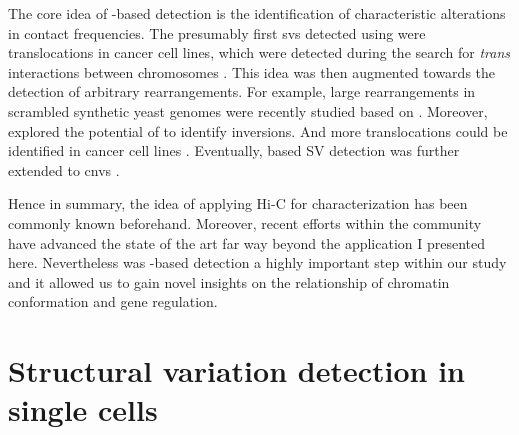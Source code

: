 The core idea of \hic-based \sv detection is the identification of characteristic
alterations in contact frequencies. The presumably first \acp{sv} detected using
\hic were translocations in cancer cell lines, which were detected during the
search for \textit{trans} interactions between chromosomes \citep{Rickman2012}.
This idea was then augmented towards the detection of arbitrary rearrangements.
For example, large rearrangements in scrambled synthetic yeast genomes were
recently studied based on \hic \citep{Mercy2017}. Moreover, \citet{Putnam2016}
explored the potential of \hic to identify inversions. And more translocations
could be identified in cancer cell lines \citep{Barutcu2015,Ay2015,Harewood2017}.
Eventually, \hic based SV detection was further extended to \acp{cnv}
\citep{Harewood2017,Li2018}.

Hence in summary, the idea of applying Hi-C for \sv characterization has been
commonly known beforehand. Moreover, recent efforts within the community
have advanced the state of the art far way beyond the application I presented
here.  Nevertheless was \hic-based \sv detection a highly important step within
our study and it allowed us to gain novel insights on the relationship of
chromatin conformation and gene regulation.




\section{Structural variation detection in single cells}


